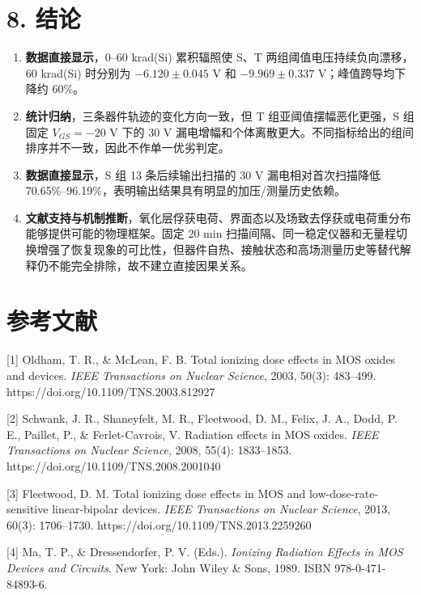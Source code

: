 \documentclass[UTF8,a4paper,12pt]{ctexart}
\providecommand{\tightlist}{%
  \setlength{\itemsep}{0pt}\setlength{\parskip}{0pt}}
\begin{document}
\section{8. 结论}\label{ux7ed3ux8bba}

\begin{enumerate}
\def\labelenumi{\arabic{enumi}.}
\tightlist
\item
  \textbf{数据直接显示}，0--60 krad(Si) 累积辐照使 S、T
  两组阈值电压持续负向漂移，60 krad(Si) 时分别为 \(-6.120\pm0.045\) V 和
  \(-9.969\pm0.337\) V；峰值跨导均下降约 60\%。
\item
  \textbf{统计归纳}，三条器件轨迹的变化方向一致，但 T
  组亚阈值摆幅恶化更强，S 组固定 \(V_{GS}=-20\) V 下的 30 V
  漏电增幅和个体离散更大。不同指标给出的组间排序并不一致，因此不作单一优劣判定。
\item
  \textbf{数据直接显示}，S 组 13 条后续输出扫描的 30 V
  漏电相对首次扫描降低
  70.65\%--96.19\%，表明输出结果具有明显的加压/测量历史依赖。
\item
  \textbf{文献支持与机制推断}，氧化层俘获电荷、界面态以及场致去俘获或电荷重分布能够提供可能的物理框架。固定
  20 min
  扫描间隔、同一稳定仪器和无量程切换增强了恢复现象的可比性，但器件自热、接触状态和高场测量历史等替代解释仍不能完全排除，故不建立直接因果关系。
\end{enumerate}

\section{参考文献}\label{ux53c2ux8003ux6587ux732e}

{[}1{]} Oldham, T. R., \& McLean, F. B. Total ionizing dose effects in
MOS oxides and devices. \emph{IEEE Transactions on Nuclear Science},
2003, 50(3): 483--499. https://doi.org/10.1109/TNS.2003.812927

{[}2{]} Schwank, J. R., Shaneyfelt, M. R., Fleetwood, D. M., Felix, J.
A., Dodd, P. E., Paillet, P., \& Ferlet-Cavrois, V. Radiation effects in
MOS oxides. \emph{IEEE Transactions on Nuclear Science}, 2008, 55(4):
1833--1853. https://doi.org/10.1109/TNS.2008.2001040

{[}3{]} Fleetwood, D. M. Total ionizing dose effects in MOS and
low-dose-rate-sensitive linear-bipolar devices. \emph{IEEE Transactions
on Nuclear Science}, 2013, 60(3): 1706--1730.
https://doi.org/10.1109/TNS.2013.2259260

{[}4{]} Ma, T. P., \& Dressendorfer, P. V. (Eds.). \emph{Ionizing
Radiation Effects in MOS Devices and Circuits}. New York: John Wiley \&
Sons, 1989. ISBN 978-0-471-84893-6.
\end{document}
